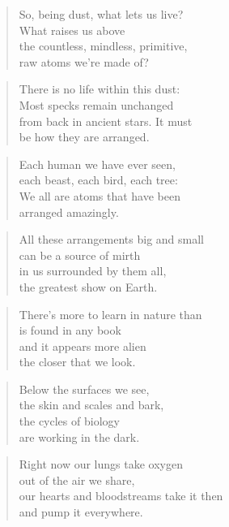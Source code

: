 \documentclass[10pt,a4paper]{article}
\begin{document}

\begin{paracol}{2}


\begin{verse}
So, being dust, what lets us live?\\
What raises us above\\
the countless, mindless, primitive,\\
raw atoms we’re made of?
\end{verse}

\begin{verse}
There is no life within this dust:\\
Most specks remain unchanged\\
from back in ancient stars. It must\\
be how they are arranged.
\end{verse}

\begin{verse}
Each human we have ever seen,\\
each beast, each bird, each tree:\\
We all are atoms that have been\\
arranged amazingly.
\end{verse}

\begin{verse}
All these arrangements big and small\\
can be a source of mirth\\
in us surrounded by them all,\\
the greatest show on Earth.
\end{verse}

\begin{verse}
There’s more to learn in nature than\\
is found in any book\\
and it appears more alien\\
the closer that we look.
\end{verse}

\begin{verse}
Below the surfaces we see,\\
the skin and scales and bark,\\
the cycles of biology\\
are working in the dark.
\end{verse}

\begin{verse}
Right now our lungs take oxygen\\
out of the air we share,\\
our hearts and bloodstreams take it then\\
and pump it everywhere.
\end{verse}


\end{paracol}
\end{document}
